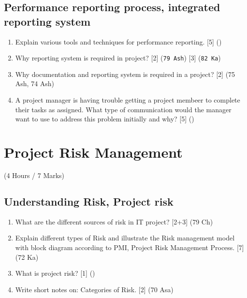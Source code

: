 \documentclass[12pt]{article}
\begin{document}
  \subsection{Performance reporting process, integrated reporting system}
    \begin{enumerate}
      \item Explain various tools and techniques for performance reporting. \hfill [5] ()

      \item Why reporting system is required in project? \hfill [2] (\texttt{79 Ash}) [3] (\texttt{82 Ka})

      \item Why documentation and reporting system is required in a project? \hfill [2] (75 Ash, 74 Ash)

      \item A project manager is having trouble getting a project membeer to complete their tasks as assigned. What type of communication would the manager want to use to address this problem initially and why? \hfill [5] ()
    \end{enumerate}

\pagebreak

\section{Project Risk Management}
  \begin{center}(4 Hours / 7 Marks)\end{center}

  \subsection{Understanding Risk, Project risk}
    \begin{enumerate}
      \item What are the different sources of risk in IT project? \hfill [2+3] (79 Ch)

      \item Explain different types of Risk and illustrate the Risk management model with block diagram according to PMI, Project Risk Management Process. \hfill [7] (72 Ka)

      \item What is project risk? \hfill [1] ()

      \item Write short notes on: Categories of Risk. \hfill [2] (70 Asa)
    \end{enumerate}
\end{document}
